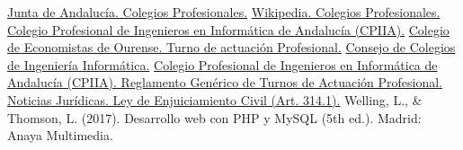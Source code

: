 
\begin{thebibliography}{0}
   \href{https://www.juntadeandalucia.es/temas/trabajar/relaciones/colegios.html}{Junta de Andalucía. Colegios Profesionales.}
   \href{https://es.wikipedia.org/wiki/Colegio_profesional}{Wikipedia. Colegios Profesionales.}
   \href{http://www.cpiiand.es}{Colegio Profesional de Ingenieros en Informática de Andalucía (CPIIA).}
   \href{http://www.economistasourense.info/es/tap}{Colegio de Economistas de Ourense. Turno de actuación Profesional.}
   \href{https://www.ccii.es/colegios-ingenieros-en-informatica}{Consejo de Colegios de Ingeniería Informática.}
   \href{http://cpiiand.es/wordpress/download/reglamentos_actualizados/metatap.pdf}{Colegio Profesional de Ingenieros en Informática de Andalucía (CPIIA). Reglamento Genérico de Turnos de Actuación Profesional.}
   \href{http://noticias.juridicas.com/base_datos/Privado/l1-2000.l2t1.html#a341}{Noticias Jurídicas. Ley de Enjuiciamiento Civil (Art. 314.1).}
   Welling, L., \& Thomson, L. (2017). Desarrollo web con PHP y MySQL (5th ed.). Madrid: Anaya Multimedia.
\end{thebibliography}

